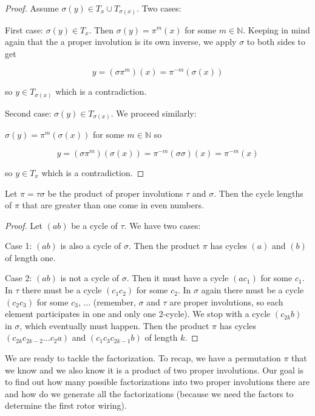 \begin{proof}

Assume $\sigma(y) \in T_x \cup T_{\sigma(x)}$. Two cases:

First case: $\sigma(y) \in T_x$. Then $\sigma(y) = \pi^m(x)$ for some $m \in \mathbb{N}$. Keeping in mind again that the a proper involution is its own inverse, we apply $\sigma$ to both sides to get

$$
y = (\sigma \pi^m)(x) = \pi^{-m} (\sigma(x))
$$

so $y \in T_{\sigma(x)}$ which is a contradiction.

Second case: $\sigma(y) \in T_{\sigma(x)}$. We proceed similarly:

$\sigma(y) = \pi^m(\sigma(x))$ for some $m \in \mathbb{N}$ so

$$
y = (\sigma \pi^m)(\sigma(x)) = \pi^{-m} (\sigma \sigma)(x) = \pi^{-m} (x)
$$

so $y \in T_x$ which is a contradiction.

\end{proof}


\begin{thm}\label{involutionproduct4}
Let $\pi = \tau \sigma$ be the product of proper involutions $\tau$ and $\sigma$. Then the cycle lengths of $\pi$ that are greater than one come in even numbers.
\end{thm}

\begin{proof}

Let $(a b)$ be a cycle of $\tau$. We have two cases: 

Case 1: $(a b)$ is also a cycle of $\sigma$. Then the product $\pi$ has cycles $(a)$ and $(b)$ of length one.

Case 2: $(a b)$ is not a cycle of $\sigma$. Then it must have a cycle $(a c_{1})$ for some $c_{1}$. In $\tau$ there must be a cycle $(c_{1} c_{2})$ for some $c_{2}$. In $\sigma$ again there must be a cycle $(c_{2} c_{3})$ for some $c_{3}$, $\ldots$ (remember, $\sigma$ and $\tau$ are proper involutions, so each element participates in one and only one 2-cycle). We stop with a cycle $(c_{2k} b)$ in $\sigma$, which eventually must happen. Then the product $\pi$ has cycles $(c_{2k} c_{2k - 2} \ldots c_{2} a)$ and $(c_{1} c_{3} c_{2k-1} b)$ of length $k$.

\end{proof}

We are ready to tackle the factorization. To recap, we have a permutation $\pi$ that we know and we also know it is a product of two proper involutions. Our goal is to find out how many possible factorizations into two proper involutions there are and how do we generate all the factorizations (because we need the factors to determine the first rotor wiring).

